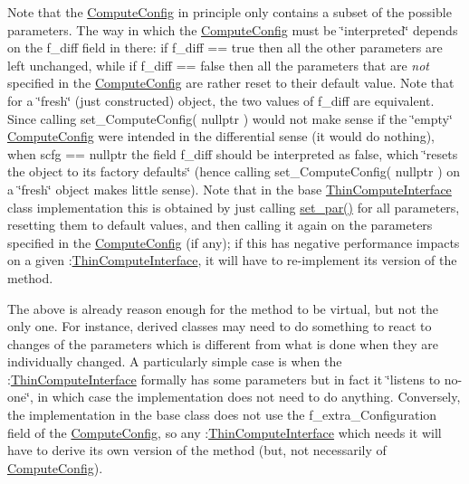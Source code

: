 Note that the \mbox{\hyperlink{class_s_m_spp__di__unipi__it_1_1_compute_config}{Compute\+Config}} in principle only contains a subset of the possible parameters. The way in which the \mbox{\hyperlink{class_s_m_spp__di__unipi__it_1_1_compute_config}{Compute\+Config}} must be \char`\"{}interpreted\char`\"{} depends on the f\+\_\+diff field in there\+: if f\+\_\+diff == true then all the other parameters are left unchanged, while if f\+\_\+diff == false then all the parameters that are {\itshape not} specified in the \mbox{\hyperlink{class_s_m_spp__di__unipi__it_1_1_compute_config}{Compute\+Config}} are rather reset to their default value. Note that for a \char`\"{}fresh\char`\"{} (just constructed) object, the two values of f\+\_\+diff are equivalent. Since calling set\+\_\+\+Compute\+Config( nullptr ) would not make sense if the \char`\"{}empty\char`\"{} \mbox{\hyperlink{class_s_m_spp__di__unipi__it_1_1_compute_config}{Compute\+Config}} were intended in the differential sense (it would do nothing), when scfg == nullptr the field f\+\_\+diff should be interpreted as false, which \char`\"{}resets the object to its factory defaults\char`\"{} (hence calling set\+\_\+\+Compute\+Config( nullptr ) on a \char`\"{}fresh\char`\"{} object makes little sense). Note that in the base \mbox{\hyperlink{class_s_m_spp__di__unipi__it_1_1_thin_compute_interface}{Thin\+Compute\+Interface}} class implementation this is obtained by just calling \mbox{\hyperlink{class_s_m_spp__di__unipi__it_1_1_thin_compute_interface_a73669f587bb938b587c54ad7e73ec297}{set\+\_\+par()}} for all parameters, resetting them to default values, and then calling it again on the parameters specified in the \mbox{\hyperlink{class_s_m_spp__di__unipi__it_1_1_compute_config}{Compute\+Config}} (if any); if this has negative performance impacts on a given \+:\mbox{\hyperlink{class_s_m_spp__di__unipi__it_1_1_thin_compute_interface}{Thin\+Compute\+Interface}}, it will have to re-\/implement its version of the method.

The above is already reason enough for the method to be virtual, but not the only one. For instance, derived classes may need to do something to react to changes of the parameters which is different from what is done when they are individually changed. A particularly simple case is when the \+:\mbox{\hyperlink{class_s_m_spp__di__unipi__it_1_1_thin_compute_interface}{Thin\+Compute\+Interface}} formally has some parameters but in fact it \char`\"{}listens to no-\/one\char`\"{}, in which case the implementation does not need to do anything. Conversely, the implementation in the base class does not use the f\+\_\+extra\+\_\+\+Configuration field of the \mbox{\hyperlink{class_s_m_spp__di__unipi__it_1_1_compute_config}{Compute\+Config}}, so any \+:\mbox{\hyperlink{class_s_m_spp__di__unipi__it_1_1_thin_compute_interface}{Thin\+Compute\+Interface}} which needs it will have to derive its own version of the method (but, not necessarily of \mbox{\hyperlink{class_s_m_spp__di__unipi__it_1_1_compute_config}{Compute\+Config}}). 

